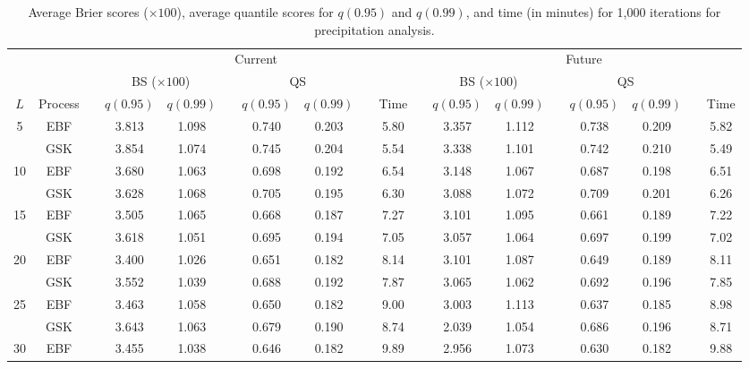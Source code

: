 \begin{landscape}
\begin{table}[htbp]
\caption{Average Brier scores ($\times 100$), average quantile scores for $q(0.95)$ and $q(0.99)$, and time (in minutes) for 1,000 iterations for precipitation analysis.}
\label{ebtbl:precip-scores}
\footnotesize
\centering
  \begin{tabular}{cc c cc c cc c c c cc c cc c c}
  \toprule
  & && \multicolumn{7}{c}{Current} && \multicolumn{7}{c}{Future}  \\
  \cmidrule{4-10} \cmidrule{12-18}
  & && \multicolumn{2}{c}{BS ($\times 100$)} && \multicolumn{2}{c}{QS} && && \multicolumn{2}{c}{BS ($\times 100$)} && \multicolumn{2}{c}{QS} \\
  \cmidrule{4-5} \cmidrule{7-8} \cmidrule{12-13} \cmidrule{15-16}
  $L$ & Process & \phantom{a} & $q(0.95)$ & $q(0.99)$ & \phantom{a} & $q(0.95)$ & $q(0.99)$ & \phantom{a} & Time & \phantom{abc} & $q(0.95)$ & $q(0.99)$ & \phantom{a} & $q(0.95)$ & $q(0.99)$ & \phantom{a} &  Time \\
  \midrule
  5  & EBF && 3.813 & 1.098 && 0.740 & 0.203 && 5.80 && 3.357 & 1.112 && 0.738 & 0.209 && 5.82\\
         & GSK && 3.854 & 1.074 && 0.745 & 0.204 && 5.54 && 3.338 & 1.101 && 0.742 & 0.210 && 5.49\\
  \midrule
  10 & EBF && 3.680 & 1.063 && 0.698 & 0.192 && 6.54 && 3.148 & 1.067 && 0.687 & 0.198 && 6.51\\
         & GSK && 3.628 & 1.068 && 0.705 & 0.195 && 6.30 && 3.088 & 1.072 && 0.709 & 0.201 && 6.26\\
  \midrule
  15 & EBF && 3.505 & 1.065 && 0.668 & 0.187 && 7.27 && 3.101 & 1.095 && 0.661 & 0.189 && 7.22\\
         & GSK && 3.618 & 1.051 && 0.695 & 0.194 && 7.05 && 3.057 & 1.064 && 0.697 & 0.199 && 7.02\\
  \midrule
  20 & EBF && 3.400 & 1.026 && 0.651 & 0.182 && 8.14 && 3.101 & 1.087 && 0.649 & 0.189 && 8.11\\
         & GSK && 3.552 & 1.039 && 0.688 & 0.192 && 7.87 && 3.065 & 1.062 && 0.692 & 0.196 && 7.85\\
  \midrule
  25 & EBF && 3.463 & 1.058 && 0.650 & 0.182 && 9.00 && 3.003 & 1.113 && 0.637 & 0.185 && 8.98\\
         & GSK && 3.643 & 1.063 && 0.679 & 0.190 && 8.74 && 2.039 & 1.054 && 0.686 & 0.196 && 8.71\\
  \midrule
  30 & EBF && 3.455 & 1.038 && 0.646 & 0.182 && 9.89 && 2.956 & 1.073 && 0.630 & 0.182 && 9.88\\

\end{tabular}
\end{table}
\end{landscape}
